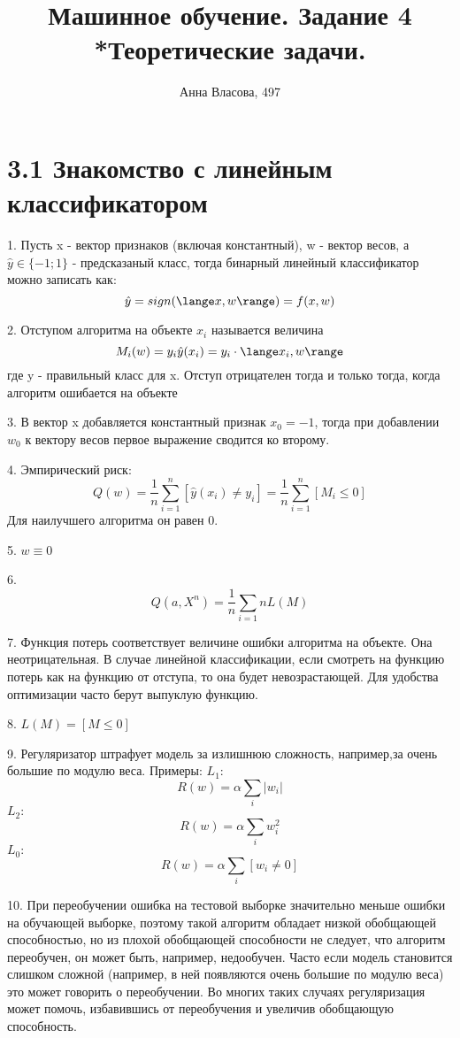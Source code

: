 \documentclass{article}
\title{Машинное обучение. Задание 4\\*Теоретические задачи.}
\author{Анна Власова, 497}
\date{}
\begin{document}
\maketitle

\section*{3.1 Знакомство с линейным классификатором}
1. Пусть x - вектор признаков (включая константный), w - вектор весов, а $\hat y \in \{-1; 1\}$ - предсказаный класс, тогда бинарный линейный классификатор можно записать как: $$ \hat y = sign(\lange x, w \range) = f(x, w)$$ 

2. Отступом алгоритма на объекте $x_i$ называется величина $$M_i(w) = y_i \hat y(x_i) = y_i \cdot \lange x_i, w \range $$ 
где y - правильный класс для x. Отступ отрицателен тогда и только тогда, когда алгоритм ошибается на объекте

3. В вектор x добавляется константный признак $x_0 = -1$, тогда при добавлении $w_0$ к вектору весов первое выражение сводится ко второму.

4. Эмпирический риск: $$Q(w) = \frac{1}{n} \sum_{i=1}^{n} [\hat y(x_i) \not= y_i] = \frac{1}{n} \sum_{i=1}^{n} [M_i \le 0] $$ Для наилучшего алгоритма он равен 0.

5. $w \equiv 0$

6. $$ Q(a, X^n) = \frac{1}{n} \sum_{i=1}{n} L(M)$$

7. Функция потерь соответствует величине ошибки алгоритма на объекте. Она неотрицательная. В случае линейной классификации, если смотреть на функцию потерь как на функцию от отступа, то она будет невозрастающей. Для удобства оптимизации часто берут выпуклую функцию.

8. $L(M) = [M \le 0]$

9. Регуляризатор штрафует модель за излишнюю сложность, например,за очень большие по модулю веса. Примеры:
$L_1:$ $$ R(w) = \alpha \sum_i |w_i|$$
$L_2:$ $$ R(w) = \alpha \sum_i w_i^2$$
$L_0:$ $$ R(w) = \alpha \sum_i [w_i \not=0]$$

10. При переобучении ошибка на тестовой выборке значительно меньше ошибки на обучающей выборке, поэтому такой алгоритм обладает низкой обобщающей способностью, но из плохой обобщающей способности не следует, что алгоритм переобучен, он может быть, например, недообучен. Часто если модель становится слишком сложной (например, в ней появляются очень большие по модулю веса) это может говорить о переобучении. Во многих таких случаях регуляризация может помочь, избавившись от переобучения и увеличив обобщающую способность.
\end{document}
